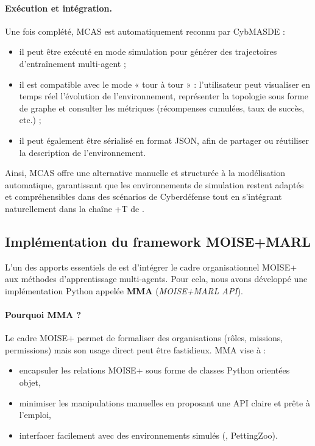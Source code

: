 \paragraph{Exécution et intégration.}
Une fois complété, MCAS est automatiquement reconnu par CybMASDE :
\begin{itemize}
  \item il peut être exécuté en mode simulation pour générer des trajectoires d’entraînement multi-agent ;
  \item il est compatible avec le mode « tour à tour » : l’utilisateur peut visualiser en temps réel l’évolution de l’environnement, représenter la topologie sous forme de graphe et consulter les métriques (récompenses cumulées, taux de succès, etc.) ;
  \item il peut également être sérialisé en format JSON, afin de partager ou réutiliser la description de l’environnement.
\end{itemize}

Ainsi, MCAS offre une alternative manuelle et structurée à la modélisation automatique, garantissant que les environnements de simulation restent adaptés et compréhensibles dans des scénarios de Cyberdéfense tout en s’intégrant naturellement dans la chaîne +T de .


\subsection{Implémentation du framework MOISE+MARL}

L’un des apports essentiels de  est d’intégrer le cadre organisationnel MOISE+ aux méthodes d’apprentissage multi-agents. Pour cela, nous avons développé une implémentation Python appelée \textbf{MMA} (\textit{MOISE+MARL API})\footnotemark[2].


\paragraph{Pourquoi MMA ?}
Le cadre MOISE+ permet de formaliser des organisations (rôles, missions, permissions) mais son usage direct peut être fastidieux. MMA vise à :
\begin{itemize}
  \item encapsuler les relations MOISE+ sous forme de classes Python orientées objet,
  \item minimiser les manipulations manuelles en proposant une API claire et prête à l’emploi,
  \item interfacer facilement avec des environnements simulés (, PettingZoo).
\end{itemize}

